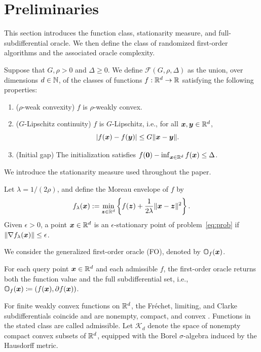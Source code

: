 \section{Preliminaries}
\label{sec:pre}
This section introduces the function class, stationarity measure,
and full-subdifferential oracle. We then define the class of
randomized first-order algorithms and the associated oracle complexity.
\begin{definition}
Suppose that \(G,\rho>0\) {\color{black}and} {\color{black}\(\Delta\geq0\)}. We define \(\mathcal F(G,\rho,\Delta)\)
as the union, over dimensions \(d\in{\mathbb{N}}\), of the classes of functions
\(f:{\mathbb{R}}^d\to{\mathbb{R}}\) satisfying the following properties:
\begin{enumerate}[label=(\roman*)]
 \item (\(\rho\)-weak convexity) \(f\) is \(\rho\)-weakly convex.
 \item ($G$-Lipschitz continuity) $f$ is $G$-Lipschitz, i.e., for all $\bm{x},\bm{y}\in {\mathbb{R}}^d$, 
 $$
 |f(\bm{x})-f(\bm{y})|\leq G\|\bm{x}-\bm{y}\|. 
 $$
 \item (Initial gap)  The initialization satisfies $f({\mathbf 0})-\inf_{\bm{x}\in{\mathbb{R}}^d} f(\bm{x})\leq\Delta$.
\end{enumerate}
\end{definition}

{We introduce the stationarity measure used throughout the paper.}
\begin{definition}
\label{def:stationary}
Let $\lambda=1/(2\rho)$, and define the Moreau envelope of $f$ by
\[
 f_\lambda(\bm{x}):=\min_{\bm{z}\in{\mathbb{R}}^d}
 \left\{f(\bm{z})+\frac{1}{2\lambda}\|\bm{x}-\bm{z}\|^2\right\}.
\]
Given $\epsilon>0$, a point $\bm{x}\in{\mathbb{R}}^d$ is an
$\epsilon$-stationary point of problem~\eqref{eq:prob} if
$\|\nabla f_\lambda(\bm{x})\|\leq\epsilon$.
\end{definition}

{We consider the generalized first-order oracle (FO), denoted by
$\mathbb O_f(\bm{x})$.}
\begin{definition}
For each query point \(\bm{x}\in{\mathbb{R}}^d\) and each admissible \(f\), the {\color{black}first-order} oracle returns both the function value and the full subdifferential set, i.e.,
$\mathbb{O}_f(\bm{x}) \coloneqq (f(\bm{x}),\partial f(\bm{x}))$. 
\end{definition}

\begingroup
\color{black}
For finite weakly convex functions on ${\mathbb{R}}^d$, the Fr\'echet,
limiting, and Clarke subdifferentials coincide and are nonempty,
compact, and convex \citep{rockafellar2009variational}.
Functions in the stated class are called admissible.
Let $\mathcal K_d$ denote the space of nonempty compact convex
subsets of ${\mathbb{R}}^d$, equipped with the Borel $\sigma$-algebra
induced by the Hausdorff metric.

